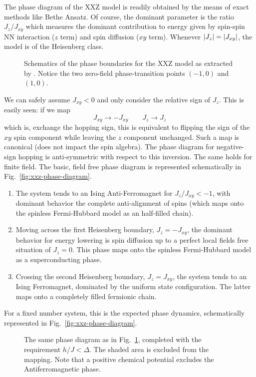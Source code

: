 The phase diagram of the $\mathrm{XXZ}$ model is readily obtained by the means of exact methods like Bethe Ansatz. Of course, the dominant parameter is the ratio $J_z/J_{xy}$ which measures the dominant contribution to energy given by spin-spin NN interaction ($z$ term) and spin diffusion ($xy$ term). Whenever $\abs{J_z} = \abs{J_{xy}}$, the model is of the Heisenberg class.
%
\begin{figure}[t]
	\centering
	
	\caption{Schematics of the phase boundaries for the $\mathrm{XXZ}$ model as extracted by \citeauthor{franchini2016integrable} \cite[Sec.~4.1]{franchini2016integrable}. Notice the two zero-field phase-transition points $(-1,0)$ and $(1,0)$.}
	\label{fig:xxz-field-phase-diagram}
\end{figure}
%
We can safely assume $J_{xy}<0$ and only consider the relative sign of $J_z$. This is easily seen: if we map
\[
	J_{xy} \to - J_{xy}
	\qquad
	J_z \to J_z
\]
which is, exchange the hopping sign, this is equivalent to flipping the sign of the $xy$ spin component while leaving the $z$ component unchanged. Such a map is canonical (does not impact the spin algebra). The phase diagram for negative-sign hopping is anti-symmetric with respect to this inversion. The same holds for finite field. The basic, field free phase diagram is represented schematically in Fig.~\ref{fig:xxz-phase-diagram}.
\begin{enumerate}
	\item The system tends to an Ising Anti-Ferromagnet for $J_z / J_{xy} < -1$, with dominant behavior the complete anti-alignment of spins (which maps onto the spinless Fermi-Hubbard model as an half-filled chain). 
	\item Moving across the first Heisenberg boundary, $J_z = - J_{xy}$, the dominant behavior for energy lowering is spin diffusion up to a perfect local fields free situation of $J_z = 0$. This phase maps onto the spinless Fermi-Hubbard model as a superconducting phase.
	\item Crossing the second Heisenberg boundary, $J_z = J_{xy}$, the system tends to an Ising Ferromagnet, dominated by the uniform state configuration. The latter maps onto a completely filled fermionic chain.
\end{enumerate}
For a fixed number system, this is the expected phase dynamics, schematically represented in Fig.~\ref{fig:xxz-phase-diagram}.
%
\begin{figure}
	\centering
	
	\caption{The same phase diagram as in Fig.~\ref{fig:xxz-field-phase-diagram}, completed with the requirement $h/J < \Delta$. The shaded area is excluded from the mapping. Note that a positive chemical potential excludes the Antiferromagnetic phase.}
	\label{fig:jordan-wigner-phase-diagram}
\end{figure}
